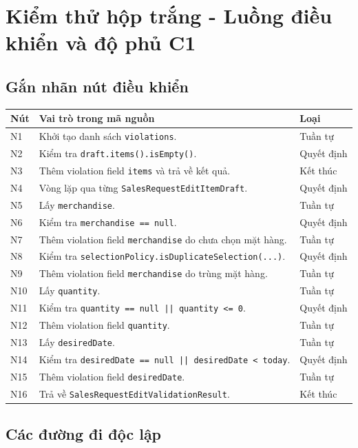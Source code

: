 \documentclass[12pt,a4paper]{article}
\newcommand{\code}[1]{\texttt{#1}}
\begin{document}
\section{Kiểm thử hộp trắng - Luồng điều khiển và độ phủ C1}

\subsection{Gắn nhãn nút điều khiển}

\begin{longtable}{p{}p{}p{}}
\toprule
\textbf{Nút} & \textbf{Vai trò trong mã nguồn} & \textbf{Loại}\\
\midrule
N1 & Khởi tạo danh sách \code{violations}. & Tuần tự\\
N2 & Kiểm tra \code{draft.items().isEmpty()}. & Quyết định\\
N3 & Thêm violation field \code{items} và trả về kết quả. & Kết thúc\\
N4 & Vòng lặp qua từng \code{SalesRequestEditItemDraft}. & Quyết định\\
N5 & Lấy \code{merchandise}. & Tuần tự\\
N6 & Kiểm tra \code{merchandise == null}. & Quyết định\\
N7 & Thêm violation field \code{merchandise} do chưa chọn mặt hàng. & Tuần tự\\
N8 & Kiểm tra \code{selectionPolicy.isDuplicateSelection(...)}. & Quyết định\\
N9 & Thêm violation field \code{merchandise} do trùng mặt hàng. & Tuần tự\\
N10 & Lấy \code{quantity}. & Tuần tự\\
N11 & Kiểm tra \code{quantity == null || quantity <= 0}. & Quyết định\\
N12 & Thêm violation field \code{quantity}. & Tuần tự\\
N13 & Lấy \code{desiredDate}. & Tuần tự\\
N14 & Kiểm tra \code{desiredDate == null || desiredDate < today}. & Quyết định\\
N15 & Thêm violation field \code{desiredDate}. & Tuần tự\\
N16 & Trả về \code{SalesRequestEditValidationResult}. & Kết thúc\\
\bottomrule
\end{longtable}

\subsection{Các đường đi độc lập}
\end{document}
